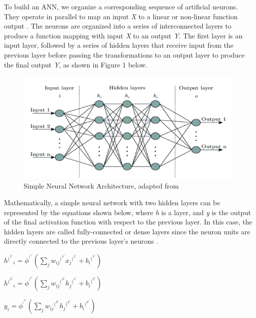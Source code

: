 \documentclass{article}
\begin{document}
To build an ANN, we organize a corresponding sequence of artificial neurons. They operate in parallel to map an input \emph{X} to a linear or non-linear function output \cite{https://doi.org/10.1002/cpe.6767,seger2018investigation}. The neurons are organized into a series of interconnected layers to produce a function mapping with input \emph{X} to an output \emph{Y}. The first layer is an input layer, followed by a series of hidden layers that receive input from the previous layer before passing the transformations to an output layer to produce the final output \emph{Y}, as shown in Figure 1 below.

\begin{figure}[h!]
    \centering
    \includegraphics[scale=0.75]{NN_figure.png}
    \caption{Simple Neural Network Architecture, adapted from \cite{https://doi.org/10.1002/cpe.6767}}
    \label{fig:my_label}
\end{figure}


Mathematically, a simple neural network with two hidden layers can be represented by the equations shown below, where \emph{h} is a layer, and \emph{y} is the output of the final activation function with respect to the previous layer. In this case, the hidden layers are called fully-connected or dense layers since the neuron units are directly connected to the previous layer’s neurons \cite{grosse2019lecture03}.
\newline
\newline
\centerline{$h{^(^1^)}_{i} = \phi^{^(^1^)}(\sum_{j} w_{ij}{^(^1^)}x_j{^(^1^)} + b_i{^(^1^)})$}

\centerline{$h{^(^2^)}_{i} = \phi^{^(^2^)}(\sum_{j} w_{ij}{^(^2^)}h_j{^(^1^)} + b_i{^(^2^)})$}

\centerline{$y_{i} = \phi^{^(^3^)}(\sum_{j} w_{ij}{^(^3^)}h_j{^(^2^)} + b_i{^(^3^)})$ \cite{grosse2019lecture03}}
\end{document}
